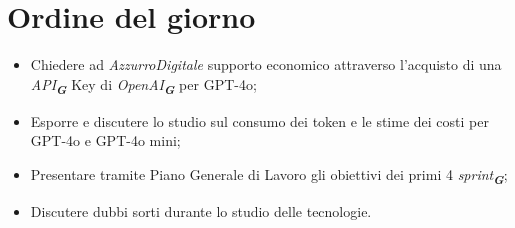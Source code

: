 

\section{Ordine del giorno}

\begin{itemize}
    \item Chiedere ad \emph{AzzurroDigitale} supporto economico attraverso l'acquisto di una \emph{API}\textsubscript{\textit{\textbf{G}}} Key di \emph{OpenAI}\textsubscript{\textit{\textbf{G}}} per GPT-4o;
    \item Esporre e discutere lo studio sul consumo dei token e le stime dei costi per GPT-4o e GPT-4o mini;
    \item Presentare tramite Piano Generale di Lavoro gli obiettivi dei primi 4 \emph{sprint}\textsubscript{\textit{\textbf{G}}};
    \item Discutere dubbi sorti durante lo studio delle tecnologie.
\end{itemize}
